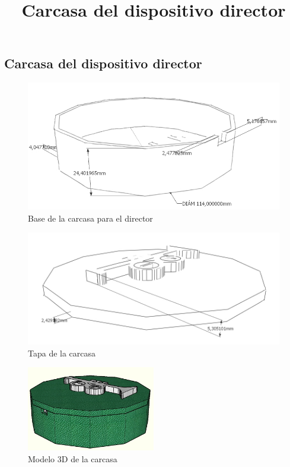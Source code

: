 \clearpage

\subsection{Carcasa del dispositivo director}
\title{Carcasa del dispositivo director}

\begin{figure}[!htb]
\centering
\includegraphics[width=1\textwidth]{./imagenes/carcasa_base_director}
\caption{Base de la carcasa para el director} \label{fig:carcasa_base_director}
\end{figure}

\begin{figure}[!htb]
\centering
\includegraphics[width=1\textwidth]{./imagenes/carcasa_tapa}
\caption{Tapa de la carcasa} \label{fig:carcasa_tapa}
\end{figure}

\begin{figure}[!htb]
\centering
\includegraphics[width=0.5\textwidth]{./imagenes/carcasa_modelo_director}
\caption{Modelo 3D de la carcasa} \label{fig:carcasa_modelo}
\end{figure}



